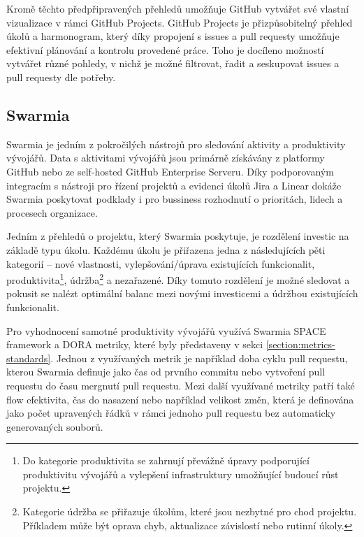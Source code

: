Kromě těchto předpřipravených přehledů umožňuje GitHub vytvářet své vlastní vizualizace v rámci GitHub Projects. GitHub Projects je přizpůsobitelný přehled úkolů a harmonogram, který díky propojení s issues a pull requesty umožňuje efektivní plánování a kontrolu provedené práce. Toho je docíleno možností vytvářet různé pohledy, v nichž je možné filtrovat, řadit a seskupovat issues a pull requesty dle potřeby. \cite{GitHub-projects}

\subsection{Swarmia}
Swarmia je jedním z pokročilých nástrojů pro sledování aktivity a produktivity vývojářů. Data s aktivitami vývojářů jsou primárně získávány z platformy GitHub nebo ze self-hosted GitHub Enterprise Serveru. Díky podporovaným integracím s nástroji pro řízení projektů a evidenci úkolů Jira a Linear dokáže Swarmia poskytovat podklady i pro bussiness rozhodnutí o prioritách, lidech a procesech organizace. \cite{Swarmia-Integrations, Swarmia-business-outcomes}

Jedním z přehledů o projektu, který Swarmia poskytuje, je rozdělení investic na základě typu úkolu. Každému úkolu je přiřazena jedna z následujících pěti kategorií -- nové vlastnosti, vylepšování/úprava existujících funkcionalit, produktivita\footnote{Do kategorie produktivita se zahrnují převážně úpravy podporující produktivitu vývojářů a vylepšení infrastruktury umožňující budoucí růst projektu.}, údržba\footnote{Kategorie údržba se přiřazuje úkolům, které jsou nezbytné pro chod projektu. Příkladem může být oprava chyb, aktualizace závislostí nebo rutinní úkoly.} a nezařazené. Díky tomuto rozdělení je možné sledovat a pokusit se nalézt optimální balanc mezi novými investicemi a údržbou existujících funkcionalit. \cite{Swarmia-investment-balance}

Pro vyhodnocení samotné produktivity vývojářů využívá Swarmia SPACE framework a DORA metriky, které byly představeny v sekci \ref{section:metrics-standards}. Jednou z využívaných metrik je například doba cyklu pull requestu, kterou Swarmia definuje jako čas od prvního commitu nebo vytvoření pull requestu do času mergnutí pull requestu. \cite{Swarmia-pull-request-cycle} Mezi další využívané metriky patří také flow efektivita, čas do nasazení nebo například velikost změn, která je definována jako počet upravených řádků v rámci jednoho pull requestu bez automaticky generovaných souborů. \cite{Swarmia-metrics, Swarmia-batch-size}

